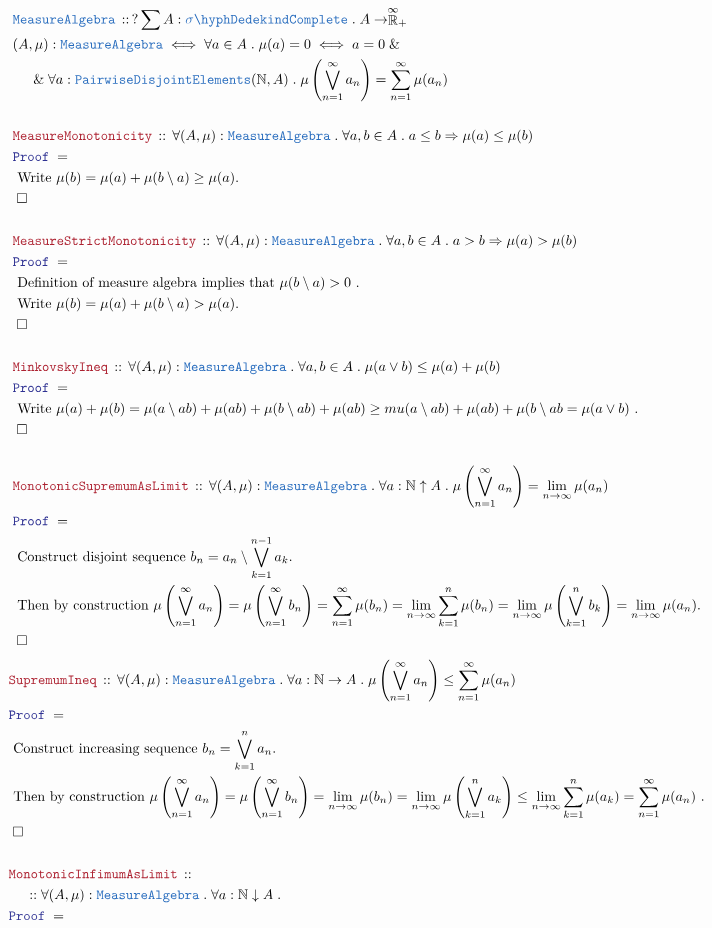 \documentclass[12pt]{scrartcl}
\newcommand{\TYPE}[1]{\textcolor{NavyBlue}{\mathtt{#1}}}
\newcommand{\LOGIC}[1]{\textcolor{Blue}{\mathtt{#1}}}
\newcommand{\THM}[1]{\textcolor{Maroon}{\mathtt{#1}}}
\renewcommand{\.}{\; . \;}
\newcommand{\Theorem}[2]{& \THM{#1} \, :: \, #2 \\ & \Proof = \\ }
\newcommand{\DeclareType}[2]{& \TYPE{#1} \, :: \, #2 \\}
\newcommand{\DefineType}[3]{& #1 : \TYPE{#2} \iff #3 \\}
\newcommand{\NewLine}{\\ & \kern 1pc}
\newcommand{\Page}[1]{ \begin{align*} #1 \end{align*}   }
\renewcommand{\And}{\; \& \;}
\newcommand{\Imply}{\Rightarrow}
\newcommand{\Nat}{\mathbb{N} }
\newcommand{\EReals}{\stackrel{\mathclap{\infty}}{\mathbb{R}}}
\newcommand{\QED}{\; \square}
\newcommand{\EndProof}{& \QED \\}
\newcommand{\Proof}{\LOGIC{Proof} \; }
\newcommand{\Explain}[1]{& \text{#1.} \\}
\newcommand{\PD}{\TYPE{PairwiseDisjointElements}}
\newcommand{\SComplete}{\TYPE{\sigma\hyph DedekindComplete}}
\newcommand{\MA}{\TYPE{MeasureAlgebra}}
\begin{document}
\Page{
	\DeclareType{MeasureAlgebra}
	{
		? \sum A : \SComplete \. A \to \EReals_+
	}
	\DefineType{(A,\mu)}{MeasureAlgebra}
	{
			\forall a \in A \. \mu(a) = 0 \iff a = 0
			\And \NewLine \And
			\forall a : \PD(\Nat,A) \. 
			\mu\left(\bigvee^\infty_{n=1}  a_n \right) = \sum^\infty_{n=1} \mu(a_n)
	}
	\\
	\Theorem{MeasureMonotonicity}
	{
		\forall (A,\mu) : \MA \. 
		\forall a,b \in A \. 
		a \le b \Imply  \mu(a) \le \mu(b)
	}
	\Explain{ Write $\mu(b) = \mu(a) + \mu(b\setminus a) \ge \mu(a)$}
	\EndProof
	\\
	\Theorem{MeasureStrictMonotonicity}
	{
		\forall (A,\mu) : \MA \. 
		\forall a,b \in A \. 
		a > b \Imply  \mu(a) > \mu(b)
	}
	\Explain{ Definition of measure algebra implies that $\mu(b \setminus a) > 0$ }
	\Explain{ Write $\mu(b) = \mu(a) + \mu(b\setminus a) > \mu(a)$}
	\EndProof
	\\
	\Theorem{MinkovskyIneq}
	{
		\forall (A,\mu) : \MA \.
		\forall a,b \in A \. 
		\mu(a \vee b) \le \mu(a) + \mu(b)
	}
	\Explain{
		Write
		$
			\mu(a) + \mu(b) =
		    \mu(a \setminus ab) + \mu(ab) + \mu(b \setminus ab) + \mu(ab) 
		    \ge   mu(a \setminus ab) + \mu(ab) + \mu(b \setminus ab = 
		    \mu(a \vee b)
		$
	}
	\EndProof
	\\
	\Theorem{MonotonicSupremumAsLimit}
	{
		\forall (A,\mu) : \MA \.
		\forall a : \Nat \uparrow A \. 
		\mu\left( \bigvee^\infty_{n=1} a_n\right)  = \lim_{n \to \infty} \mu(a_n)
	}
	\Explain{ Construct disjoint sequence $b_n = a_n \setminus \bigvee^{n-1}_{k=1} a_k$}
	\Explain{ Then by construction 
			$
				\mu\left( \bigvee^\infty_{n=1} a_n \right) = 
				\mu\left(  \bigvee^\infty_{n=1} b_n \right) =
				\sum^\infty_{n=1} \mu(b_n) = 
				\lim_{n \to \infty} \sum^n_{k=1} \mu(b_n) =
				\lim_{n \to \infty} \mu\left(\bigvee^n_{k=1} b_k\right) =
				\lim_{n \to \infty} \mu(a_n)
			$}
	\EndProof
}\Page{
	\Theorem{SupremumIneq}
	{
		\forall (A,\mu) : \MA \.
		\forall a : \Nat \to A \. 
		\mu\left( \bigvee^\infty_{n=1} a_n\right) \le \sum^\infty_{n=1} \mu(a_n)
	}
	\Explain{ Construct increasing sequence $b_n = \bigvee^n_{k=1} a_n$}
	\Explain{
		Then by construction
		$
			\mu\left( \bigvee^\infty_{n=1} a_n \right) = 
			\mu\left(  \bigvee^\infty_{n=1} b_n \right) =
			\lim_{n \to \infty} \mu( b_n ) =
			\lim_{n \to \infty} \mu\left( \bigvee^n_{k=1} a_k \right)  \le 
			\lim_{n \to \infty} \sum^n_{k=1} \mu(a_k) =
			\sum^\infty_{n=1} \mu(a_n)  
		$
	}
	\EndProof
	\\
	\Theorem{MonotonicInfimumAsLimit}
	{
		\NewLine ::		
		\forall (A,\mu) : \MA \.
		\forall a : \Nat \downarrow A \.
}}
\end{document}
